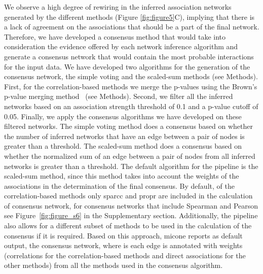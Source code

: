   We observe a high degree of rewiring in the inferred association networks generated by the different methods (Figure \ref{fig:figure5}C), implying that there is a lack of agreement on the associations that should be a part of the final network.
  Therefore, we have developed a consensus method that would take into consideration the evidence offered by each network inference algorithm and generate a consensus network that would contain the most probable interactions for the input data.
  We have developed two algorithms for the generation of the consensus network, the simple voting and the scaled-sum methods (see Methods).
  First, for the correlation-based methods we merge the p-values using the Brown's p-value merging method~\cite{Poole_Gibbs_Shmulevich_Bernard_Knijnenburg_2016,faustCoNetAppInference2016} (see Methods).
  Second, we filter all the inferred networks based on an association strength threshold of 0.1 and a p-value cutoff of 0.05.
  Finally, we apply the consensus algorithms we have developed on these filtered networks.
  The simple voting method does a consensus based on whether the number of inferred networks that have an edge between a pair of nodes is greater than a threshold.
  The scaled-sum method does a consensus based on whether the normalized sum of an edge between a pair of nodes from all inferred networks is greater than a threshold.
  The default algorithm for the pipeline is the scaled-sum method, since this method takes into account the weights of the associations in the determination of the final consensus.
  By default, of the correlation-based methods only \ac{sparcc} and propr are included in the calculation of consensus network, for consensus networks that include Spearman and Pearson see Figure~\ref{fig:figure_s6} in the Supplementary section.
  Additionally, the pipeline also allows for a different subset of methods to be used in the calculation of the consensus if it is required.
  Based on this approach, \ac{micone} reports as default output, the consensus network, where is each edge is annotated with weights (correlations for the correlation-based methods and direct associations for the other methods) from all the methods used in the consensus algorithm.

